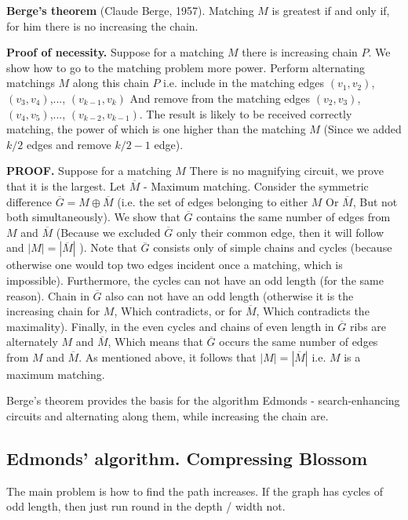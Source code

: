 \textbf{Berge's theorem} (Claude Berge, 1957). Matching $M$ is greatest if and only if, for him there is no increasing the chain.

\textbf{Proof of necessity.} Suppose for a matching $M$ there is increasing chain $P$. We show how to go to the matching problem more power. Perform alternating matchings $M$ along this chain $P$ i.e. include in the matching edges $(v_1, v_2)$, $(v_3, v_4)$,..., $(v_ {k-1}, v_k)$ And remove from the matching edges $(v_2, v_3)$, $(v_4, v_5)$,..., $(v_ {k-2}, v_ {k-1})$. The result is likely to be received correctly matching, the power of which is one higher than the matching $M$ (Since we added $k / 2$ edges and remove $k/2-1$ edge).

\textbf{PROOF.} Suppose for a matching $M$ There is no magnifying circuit, we prove that it is the largest. Let $\overline M$ - Maximum matching. Consider the symmetric difference $\overline G = M \oplus \overline M$ (i.e. the set of edges belonging to either $M$ Or $\overline M$, But not both simultaneously). We show that $\overline G$ contains the same number of edges from $M$ and $\overline M$ (Because we excluded $\overline G$ only their common edge, then it will follow and $| M | = | \overline M |$ ). Note that $\overline G$ consists only of simple chains and cycles (because otherwise one would top two edges incident once a matching, which is impossible). Furthermore, the cycles can not have an odd length (for the same reason). Chain in $\overline G$ also can not have an odd length (otherwise it is the increasing chain for $M$, Which contradicts, or for $\overline M$, Which contradicts the maximality). Finally, in the even cycles and chains of even length in $\overline G$ ribs are alternately $M$ and $\overline M$, Which means that $\overline G$ occurs the same number of edges from $M$ and $\overline M$. As mentioned above, it follows that $| M | = | \overline M |$ i.e. $M$ is a maximum matching.

Berge's theorem provides the basis for the algorithm Edmonds - search-enhancing circuits and alternating along them, while increasing the chain are.

\subsection{ Edmonds' algorithm. Compressing Blossom }

The main problem is how to find the path increases. If the graph has cycles of odd length, then just run round in the depth / width not.

